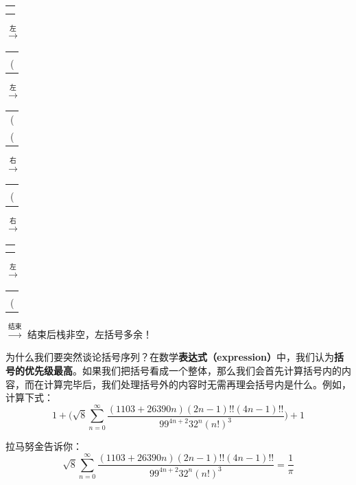 \begin{table}[H]
	\centering
	\begin{tabular}{|c|}
		\phantom{(}
		\\\hline
		\\\hline
		\\\hline
	\end{tabular}
	$\stackrel{\text{左}}{\longrightarrow}$
	\begin{tabular}{|c|}
		\phantom{(}
		\\\hline
		\\\hline
		(
		\\\hline
	\end{tabular}
	$\stackrel{\text{左}}{\longrightarrow}$
	\begin{tabular}{|c|}
		\phantom{(}
		\\\hline
		(
		\\\hline
		(
		\\\hline
	\end{tabular}
	$\stackrel{\text{右}}{\longrightarrow}$
	\begin{tabular}{|c|}
		\phantom{(}
		\\\hline
		\\\hline
		(
		\\\hline
	\end{tabular}
	$\stackrel{\text{右}}{\longrightarrow}$
	\begin{tabular}{|c|}
		\phantom{(}
		\\\hline
		\\\hline
		\\\hline
	\end{tabular}
	$\stackrel{\text{左}}{\longrightarrow}$
	\begin{tabular}{|c|}
		\phantom{(}
		\\\hline
		\\\hline
		(
		\\\hline
	\end{tabular}
	$\stackrel{\text{结束}}{\longrightarrow}$
	结束后栈非空，左括号多余！
\end{table}

为什么我们要突然谈论括号序列？在数学\textbf{表达式（expression）}中，我们认为\textbf{括号的优先级最高}。如果我们把括号看成一个整体，那么我们会首先计算括号内的内容，而在计算完毕后，我们处理括号外的内容时无需再理会括号内是什么。例如，计算下式：
$$
1 + \biggl( \sqrt{8} \sum\limits_{n = 0}^\infty \dfrac{(1103 + 26390 n) (2n - 1)!! (4n - 1)!!}{99^{4n + 2} 32^n (n!)^3} \biggr) + 1
$$

拉马努金告诉你：
$$
\sqrt{8} \sum\limits_{n = 0}^\infty \dfrac{(1103 + 26390 n) (2n - 1)!! (4n - 1)!!}{99^{4n + 2} 32^n (n!)^3} = \dfrac{1}{\pi}
$$

